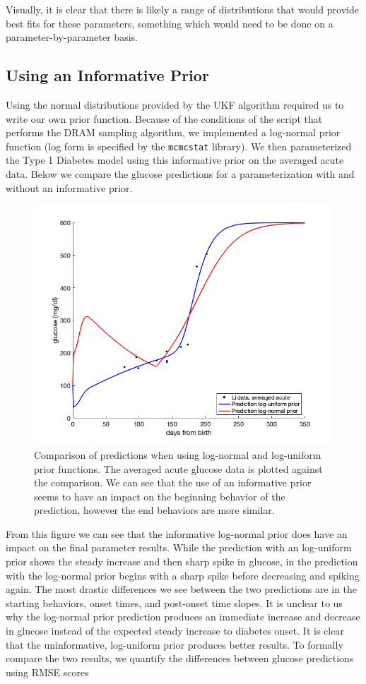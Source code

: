 \documentclass{article}
\begin{document}
Visually, it is clear that there is likely a range of distributions that would provide best fits for these parameters, something which would need to be done on a parameter-by-parameter basis. 

\subsection{Using an Informative Prior}
Using the normal distributions provided by the UKF algorithm required us to write our own prior function. Because of the conditions of the script that performs the DRAM sampling algorithm, we implemented a log-normal prior function (log form is specified by the \texttt{mcmcstat} library). We then parameterized the Type 1 Diabetes model using this informative prior on the averaged acute data. Below we compare the glucose predictions for a parameterization with and without an informative prior.
\begin{figure}[H]
    \centering
    \includegraphics[width=15cm]{Comparison_Figures/dram_priorComp.png}
    \caption{Comparison of predictions when using log-normal and log-uniform prior functions. The averaged acute glucose data is plotted against the comparison. We can see that the use of an informative prior seems to have an impact on the beginning behavior of the prediction, however the end behaviors are more similar.}
\end{figure}
From this figure we can see that the informative log-normal prior does have an impact on the final parameter results. While the prediction with an log-uniform prior shows the steady increase and then sharp spike in glucose, in the prediction with the log-normal prior begins with a sharp spike before decreasing and spiking again. The most drastic differences we see between the two predictions are in the starting behaviors, onset times, and post-onset time slopes. It is unclear to us why the log-normal prior prediction produces an immediate increase and decrease in glucose instead of the expected steady increase to diabetes onset. It is clear that the uninformative, log-uniform prior produces better results. To formally compare the two results, we quantify the differences between glucose predictions using RMSE scores
\end{document}
